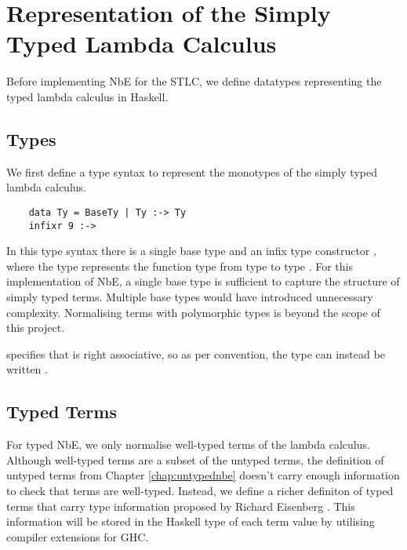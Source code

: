 \chapter{Representation of the Simply Typed Lambda Calculus}
\label{chap:typedlamadacalculus}


Before implementing NbE for the STLC, we define datatypes representing the typed lambda calculus in Haskell. 

\section{Types}

We first define a type syntax to represent the monotypes of the simply typed lambda calculus. 

\begin{lstlisting}
    data Ty = BaseTy | Ty :-> Ty 
    infixr 9 :->
\end{lstlisting}

In this type syntax there is a single base type  and an infix type constructor \code{:->}, where the type  represents the function type from type  to type . For this implementation of NbE, a single base type is sufficient to capture the structure of simply typed terms. Multiple base types would have introduced unnecessary complexity.
Normalising terms with polymorphic types is beyond the scope of this project.
 
 specifies that \code{:->} is right associative, so as per convention, the type  can instead be written .

\section{Typed Terms}

For typed NbE, we only normalise well-typed terms of the lambda calculus. Although well-typed terms are a subset of the untyped terms, the definition of untyped terms from Chapter \ref{chap:untypednbe} doesn't carry enough information to check that terms are well-typed. 
Instead, we define a richer definiton of typed terms that carry type information proposed by Richard Eisenberg \cite{GADTs}. This information will be stored in the Haskell type of each term value by utilising compiler extensions for GHC. 

